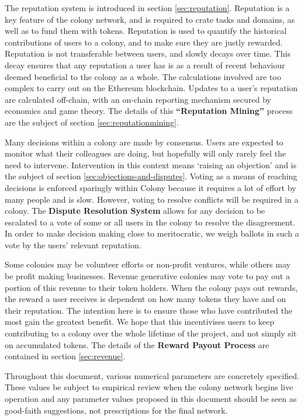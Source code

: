 The reputation system is introduced in section \ref{sec:reputation}. Reputation is a key feature of the colony network, and is required to crate tasks and domains, as well as to fund them with tokens. Reputation is used to quantify the historical contributions of users to a colony, and to make sure they are justly rewarded. Reputation is not transferable between users, and slowly decays over time. This decay ensures that any reputation a user has is as a result of recent behaviour deemed beneficial to the colony as a whole. The calculations involved are too complex to carry out on the Ethereum blockchain. Updates to a user's reputation are calculated off-chain, with an on-chain reporting mechanism secured by economics and game theory. The details of this \textbf{``Reputation Mining''} process are the subject of section \ref{sec:reputationmining}.

Many decisions within a colony are made by consensus. Users are expected to monitor what their colleagues are doing, but hopefully will only rarely feel the need to intervene. Intervention in this context means `raising an objection' and is the subject of section \ref{sec:objections-and-disputes}. Voting as a means of reaching decisions is enforced sparingly within Colony because it requires a lot of effort by many people and is slow. However, voting to resolve conflicts will be required in a colony. The \textbf{Dispute Resolution System} allows for any decision to be escalated to a vote of some or all users in the colony to resolve the disagreement. In order to make decision making close to meritocratic, we weigh ballots in such a vote by the users' relevant reputation.

Some colonies may be volunteer efforts or non-profit ventures, while others may be profit making businesses. Revenue generative colonies may vote to pay out a portion of this revenue to their token holders. When the colony pays out rewards, the reward a user receives is dependent on how many tokens they have and on their reputation. The intention here is to ensure those who have contributed the most gain the greatest benefit. We hope that this incentivises users to keep contributing to a colony over the whole lifetime of the project, and not simply sit on accumulated tokens. The details of the \textbf{Reward Payout Process} are contained in section \ref{sec:revenue}.

Throughout this document, various numerical parameters are concretely specified. These values be subject to empirical review when the colony network begins live operation and any parameter values proposed in this document should be seen as good-faith suggestions, not prescriptions for the final network.
